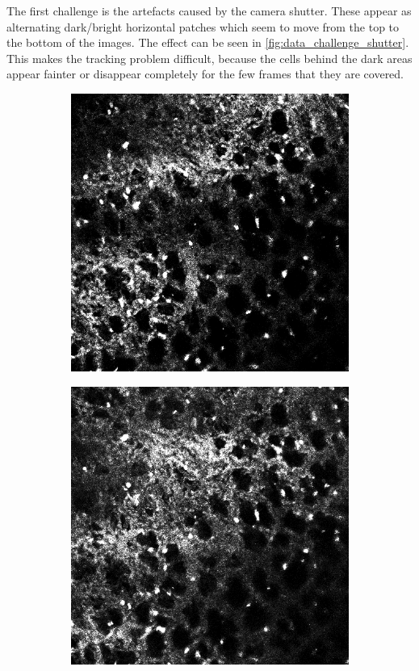 	The first challenge is the artefacts caused by the camera shutter. These appear as alternating dark/bright horizontal patches which seem to move from the top to the bottom of the images. The effect can be seen in \cref{fig:data_challenge_shutter}. This makes the tracking problem difficult, because the cells behind the dark areas appear fainter or disappear completely for the few frames that they are covered.
		
	\begin{figure}[h]
	
		\begin{subfigure}{.32\textwidth}
		\includegraphics[width=\textwidth]{images/shutterseriesm170_13cropped001}
		\end{subfigure}%
		\hfill
		\begin{subfigure}{.32\textwidth}
		\includegraphics[width=\textwidth]{images/shutterseriesm170_13cropped002}

\end{subfigure}
\end{figure}
